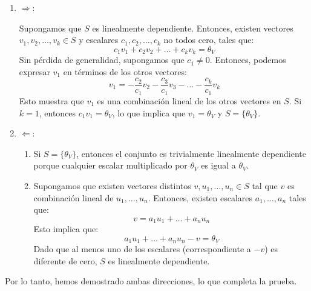 \documentclass{article}
\begin{document}
\begin{enumerate}
    \item \( \Rightarrow \):
    
    Supongamos que \( S \) es linealmente dependiente. Entonces, existen vectores \( v_1, v_2, \ldots, v_k \in S \) y escalares \( c_1, c_2, \ldots, c_k \) no todos cero, tales que:
    \[ c_1 v_1 + c_2 v_2 + \ldots + c_k v_k = \theta_V \]
    Sin pérdida de generalidad, supongamos que \( c_1 \neq 0 \). Entonces, podemos expresar \( v_1 \) en términos de los otros vectores:
    \[ v_1 = -\frac{c_2}{c_1} v_2 - \frac{c_3}{c_1} v_3 - \ldots - \frac{c_k}{c_1} v_k \]
    Esto muestra que \( v_1 \) es una combinación lineal de los otros vectores en \( S \). Si \( k = 1 \), entonces \( c_1 v_1 = \theta_V \), lo que implica que \( v_1 = \theta_V \) y \( S = \{\theta_V\} \).

    \item \( \Leftarrow \):

    \begin{enumerate}
        \item Si \( S = \{\theta_V\} \), entonces el conjunto es trivialmente linealmente dependiente porque cualquier escalar multiplicado por \( \theta_V \) es igual a \( \theta_V \).
        \item Supongamos que existen vectores distintos \( v, u_1, \ldots, u_n \in S \) tal que \( v \) es combinación lineal de \( u_1, \ldots, u_n \). Entonces, existen escalares \( a_1, \ldots, a_n \) tales que:
        \[ v = a_1 u_1 + \ldots + a_n u_n \]
        Esto implica que:
        \[ a_1 u_1 + \ldots + a_n u_n - v = \theta_V \]
        Dado que al menos uno de los escalares (correspondiente a \( -v \)) es diferente de cero, \( S \) es linealmente dependiente.
    \end{enumerate}
\end{enumerate}

Por lo tanto, hemos demostrado ambas direcciones, lo que completa la prueba.\\
\\ \\
\\ \\
\end{document}
